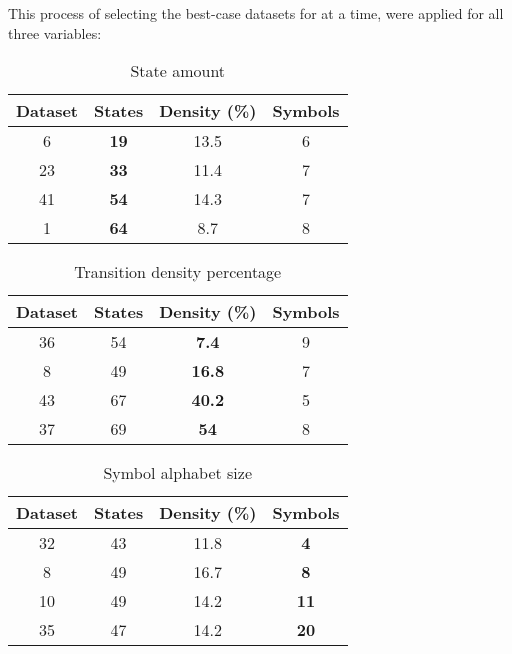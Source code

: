 This process of selecting the best-case datasets for  at a time, were applied for all three variables:

\begin{table}
\centering
{
\begin{tabular}{| c | c | c | c |}
  \hline
  Dataset 	& \textbf{States} 	& Density (\%) 	& Symbols \\  \hline
  6 			& \textbf{19 }			&	13.5				& 6 \\
  23 			& \textbf{33} 			&	11.4				& 7 \\
  41			& \textbf{54} 			&	14.3				& 7 \\
  1				& \textbf{64} 			&	8.7				& 8 \\ \hline
\end{tabular}
\caption{State amount}
\label{state_table}
}
\end{table}

\begin{table}
\centering
{
\begin{tabular}{| c | c | c | c |}
  \hline
  Dataset 	& States  			& \textbf{Density (\%)} 		& Symbols \\  \hline
  36 			&	54					& \textbf{7.4 }						& 9 \\
  8 			&	49					& \textbf{16.8 }					& 7 \\
  43			&	67					& \textbf{40.2 }					& 5 \\
  37			&	69					& \textbf{54 	}					& 8 \\ \hline
\end{tabular}
\caption{Transition density percentage}
\label{density_table}
}
\end{table}

\begin{table}
\centering
{
\begin{tabular}{| c | c | c | c |}
  \hline
  Dataset 	& States	 	& Density (\%) 	& \textbf{Symbols}	 \\  \hline
  32 			& 43				& 11.8				& \textbf{4}		\\
  8 			& 49				& 16.7 				& \textbf{8}		\\
  10			& 49				& 14.2 				& \textbf{11}	\\
  35			& 47				& 14.2 				& \textbf{20}	\\ \hline
\end{tabular}
\caption{Symbol alphabet size}
\label{symbol_table}

}
\end{table}